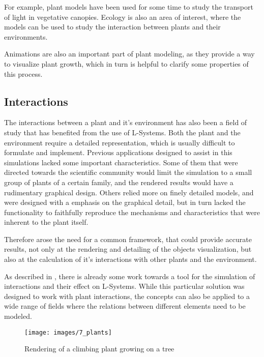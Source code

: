 \documentclass{acmtog}
\begin{document}
For example, plant models have been used for some time to study the transport of light in vegetative canopies. Ecology is also an area of interest, where the models can be used to study the interaction between plants and their environments.

Animations are also an important part of plant modeling, as they provide a way to visualize plant growth, which in turn is helpful to clarify some properties of this process.

\subsection{Interactions}
\label{subsec:interactions}

The interactions between a plant and it's environment has also been a field of study that has benefited from the use of L-Systems. Both the plant and the environment require a detailed representation, which is usually difficult to formulate and implement. Previous applications designed to assist in this simulations lacked some important characteristics. Some of them that were directed towards the scientific community would limit the simulation to a small group of plants of a certain family, and the rendered results would have a rudimentary graphical design. Others relied more on finely detailed models, and were designed with a emphasis on the graphical detail, but in turn lacked the functionality to faithfully reproduce the mechanisms and characteristics that were inherent to the plant itself.

Therefore arose the need for a common framework, that could provide accurate results, not only at the rendering and detailing of the objects visualization, but also at the calculation of it's interactions with other plants and the environment.

As described in \cite{mech1996visual}, there is already some work towards a tool for the simulation of interactions and their effect on L-Systems. While this particular solution was designed to work with plant interactions, the concepts can also be applied to a wide range of fields where the relations between different elements need to be modeled.

\begin{figure}[!htp]
  \begin{center}
    \texttt{[image: images/7\_plants]}
    \caption{Rendering of a climbing plant growing on a tree \label{fig:relations}}
    \end{center}
\end{figure}
\end{document}
